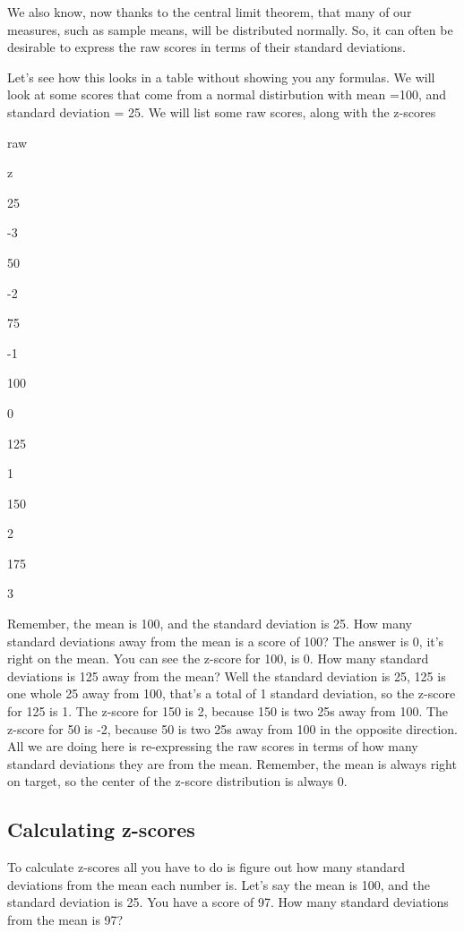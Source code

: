 \documentclass[
]{book}
\begin{document}
We also know, now thanks to the central limit theorem, that many of our measures, such as sample means, will be distributed normally. So, it can often be desirable to express the raw scores in terms of their standard deviations.

Let's see how this looks in a table without showing you any formulas. We will look at some scores that come from a normal distirbution with mean =100, and standard deviation = 25. We will list some raw scores, along with the z-scores

raw

z

25

-3

50

-2

75

-1

100

0

125

1

150

2

175

3

Remember, the mean is 100, and the standard deviation is 25. How many standard deviations away from the mean is a score of 100? The answer is 0, it's right on the mean. You can see the z-score for 100, is 0. How many standard deviations is 125 away from the mean? Well the standard deviation is 25, 125 is one whole 25 away from 100, that's a total of 1 standard deviation, so the z-score for 125 is 1. The z-score for 150 is 2, because 150 is two 25s away from 100. The z-score for 50 is -2, because 50 is two 25s away from 100 in the opposite direction. All we are doing here is re-expressing the raw scores in terms of how many standard deviations they are from the mean. Remember, the mean is always right on target, so the center of the z-score distribution is always 0.

\hypertarget{calculating-z-scores}{%
\subsection{Calculating z-scores}\label{calculating-z-scores}}

To calculate z-scores all you have to do is figure out how many standard deviations from the mean each number is. Let's say the mean is 100, and the standard deviation is 25. You have a score of 97. How many standard deviations from the mean is 97?
\end{document}
